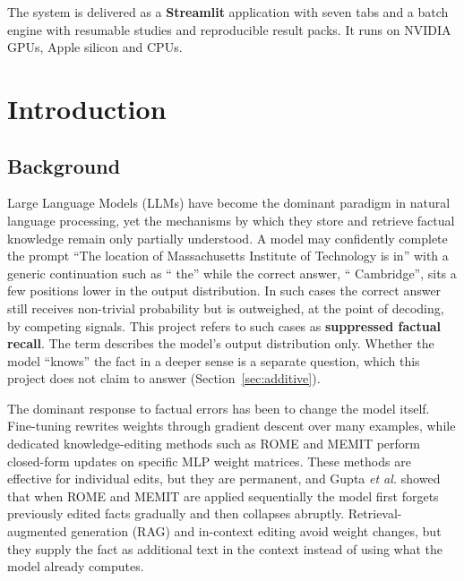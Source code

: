 \documentclass[12pt,a4paper]{report}
\begin{document}
The system is delivered as a \textbf{Streamlit} application with seven tabs and a batch engine with resumable studies and reproducible result packs. It runs on NVIDIA GPUs, Apple silicon and CPUs.

\tableofcontents
\clearpage
{}
\listoffigures
\clearpage
{}
\listoftables
\clearpage

\setcounter{page}{1}

\chapter{Introduction}\label{ch:introduction}

\section{Background}

Large Language Models (LLMs) have become the dominant paradigm in natural language processing, yet the mechanisms by which they store and retrieve factual knowledge remain only partially understood. A model may confidently complete the prompt ``The location of Massachusetts Institute of Technology is in'' with a generic continuation such as `` the'' while the correct answer, `` Cambridge'', sits a few positions lower in the output distribution. In such cases the correct answer still receives non-trivial probability but is outweighed, at the point of decoding, by competing signals. This project refers to such cases as \textbf{suppressed factual recall}. The term describes the model's output distribution only. Whether the model ``knows'' the fact in a deeper sense is a separate question, which this project does not claim to answer (Section~\ref{sec:additive}).

The dominant response to factual errors has been to change the model itself. Fine-tuning rewrites weights through gradient descent over many examples, while dedicated knowledge-editing methods such as ROME \cite{r2} and MEMIT \cite{r3} perform closed-form updates on specific MLP weight matrices. These methods are effective for individual edits, but they are permanent, and Gupta \textit{et al.} \cite{r4} showed that when ROME and MEMIT are applied sequentially the model first forgets previously edited facts gradually and then collapses abruptly. Retrieval-augmented generation (RAG) \cite{r34} and in-context editing \cite{r31} avoid weight changes, but they supply the fact as additional text in the context instead of using what the model already computes.
\end{document}
